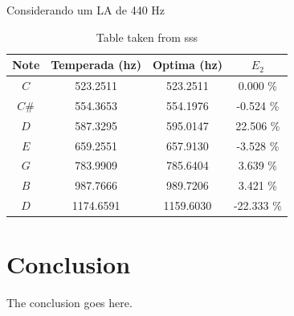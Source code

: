 \documentclass{article}
\begin{document}
Considerando um LA de 440 Hz
\begin{table}[h]
\center
\begin{tabular}{|c||c|c|c|}
\hline                           
Note & Temperada (hz) & Optima (hz) & $E_2$\\ \hline
\hline                           
    $C$ & 523.2511 & 523.2511 &   0.000 \% \\ \hline 
  $C\#$ & 554.3653 & 554.1976 &  -0.524 \% \\ \hline 
    $D$ & 587.3295 & 595.0147 &  22.506 \% \\ \hline 
    $E$ & 659.2551 & 657.9130 &  -3.528 \% \\ \hline 
    $G$ & 783.9909 & 785.6404 &   3.639 \% \\ \hline 
  $B$ & 987.7666 & 989.7206 &   3.421 \% \\ \hline 
  $D$ & 1174.6591 & 1159.6030 & -22.333 \% \\ \hline 
\end{tabular}
\vspace{5pt}
\caption{Table taken from sss}
\label{table:example1}
\end{table}


\section{Conclusion}
The conclusion goes here.




\printbibliography


\end{document}
